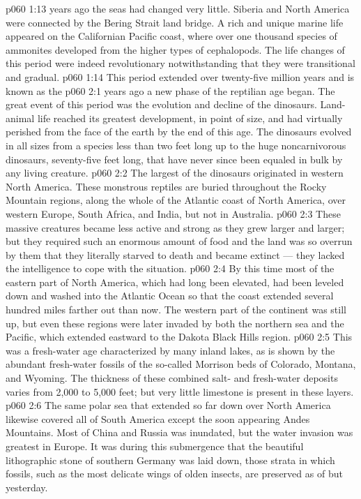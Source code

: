 \vs p060 1:13 \pc {} years ago the seas had changed very little. Siberia and North America were connected by the Bering Strait land bridge. A rich and unique marine life appeared on the Californian Pacific coast, where over one thousand species of ammonites developed from the higher types of cephalopods. The life changes of this period were indeed revolutionary notwithstanding that they were transitional and gradual.
\vs p060 1:14 \pc This period extended over twenty\hyp{}five million years and is known as the 
\vs p060 2:1  years ago a new phase of the reptilian age began. The great event of this period was the evolution and decline of the dinosaurs. Land\hyp{}animal life reached its greatest development, in point of size, and had virtually perished from the face of the earth by the end of this age. The dinosaurs evolved in all sizes from a species less than two feet long up to the huge noncarnivorous dinosaurs, seventy\hyp{}five feet long, that have never since been equaled in bulk by any living creature.
\vs p060 2:2 The largest of the dinosaurs originated in western North America. These monstrous reptiles are buried throughout the Rocky Mountain regions, along the whole of the Atlantic coast of North America, over western Europe, South Africa, and India, but not in Australia.
\vs p060 2:3 These massive creatures became less active and strong as they grew larger and larger; but they required such an enormous amount of food and the land was so overrun by them that they literally starved to death and became extinct --- they lacked the intelligence to cope with the situation.
\vs p060 2:4 By this time most of the eastern part of North America, which had long been elevated, had been leveled down and washed into the Atlantic Ocean so that the coast extended several hundred miles farther out than now. The western part of the continent was still up, but even these regions were later invaded by both the northern sea and the Pacific, which extended eastward to the Dakota Black Hills region.
\vs p060 2:5 This was a fresh\hyp{}water age characterized by many inland lakes, as is shown by the abundant fresh\hyp{}water fossils of the so\hyp{}called Morrison beds of Colorado, Montana, and Wyoming. The thickness of these combined salt\hyp{} and fresh\hyp{}water deposits varies from 2,000 to 5,000 feet; but very little limestone is present in these layers.
\vs p060 2:6 The same polar sea that extended so far down over North America likewise covered all of South America except the soon appearing Andes Mountains. Most of China and Russia was inundated, but the water invasion was greatest in Europe. It was during this submergence that the beautiful lithographic stone of southern Germany was laid down, those strata in which fossils, such as the most delicate wings of olden insects, are preserved as of but yesterday.
